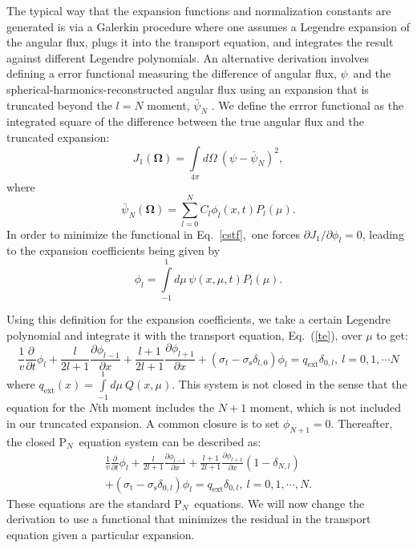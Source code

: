 \documentclass[review]{elsarticle}
\newcommand{\pn}{P$_N$}
\newcommand{\psii}[1]{\phi_\ensuremath{{#1}}}
\newcommand{\sigmas}{\sigma_\mathrm{s}}
\begin{document}
The typical way that the expansion functions and normalization constants are generated is via a Galerkin procedure where one assumes a Legendre expansion of the angular flux, plugs it into the transport equation, and integrates the result against different Legendre polynomials. An alternative derivation involves defining a {error functional} measuring the difference of angular flux, $\psi$~and the spherical-harmonics-reconstructed angular flux using an expansion that is truncated beyond the  $l=N$ moment, $\bar{\psi}_N$ \cite{mccfpn09}. We define the errror functional as the integrated square of the difference between the true angular flux and the truncated expansion:
\begin{equation}\label{cstf1}
J_1(\mathbf{\Omega})=\int\limits_{4\pi}d\Omega~(\psi-\bar{\psi}_N)^2,
\end{equation}
where
\begin{equation}\label{cstf}
\bar{\psi}_N(\mathbf{\Omega})=\sum_{l=0}^N C_l \phi_l(x,t) P_l(\mu).
\end{equation}
In order to minimize the functional in Eq.~\eqref{cstf},~one forces $\partial J_1/\partial\phi_l=0$, leading to
the expansion coefficients being given by
\begin{equation}
\phi_l=\int\limits_{-1}^{1}d\mu\,\psi(x,\mu,t)P_l(\mu).
\end{equation}

Using this definition for the expansion coefficients, we take a certain Legendre polynomial and integrate it with the transport equation, Eq.~(\ref{te}), over $\mu$ to get:
\begin{equation}
\frac{1}{v}\frac{\partial}{\partial t} \phi_l+\frac{l}{2l+1}\frac{\partial\phi_{l-1}}{\partial x} +\frac{l+1}{2l+1}\frac{\partial\phi_{l+1}}{\partial x}+ (\sigma_{t} - \sigmas\delta_{l,0} )\phi_l=q_\mathrm{ext}\delta_{0,l},~l=0,1,\cdots N
\end{equation}
where $\displaystyle q_\mathrm{ext}(x)=\int\limits_{-1}^1d\mu~Q(x,\mu)$. 
This system is not closed in the sense that the equation for the $N$th moment includes the $N+1$ moment, which is not included in our truncated expansion. A common closure is to set $\psii{N+1}=0$. Thereafter, the closed \pn~equation system can be described as:
\begin{multline}\label{pne}
\frac{1}{v}\frac{\partial}{\partial t}\phi_l+\frac{l}{2l+1}\frac{\partial\phi_{l-1}}{\partial x}+\frac{l+1}{2l+1}\frac{\partial\phi_{l+1}}{\partial x}(1-\delta_{N,l})\\+(\sigma_\mathrm{t}-\sigma_\mathrm{s}\delta_{0,l})\phi_l
=q_\mathrm{ext}\delta_{0,l},~l=0,1,\cdots,N.
\end{multline}
These equations are the standard \pn\, equations.  We will now change the derivation to use a functional that minimizes the residual in the transport equation given a particular expansion.
\end{document}
